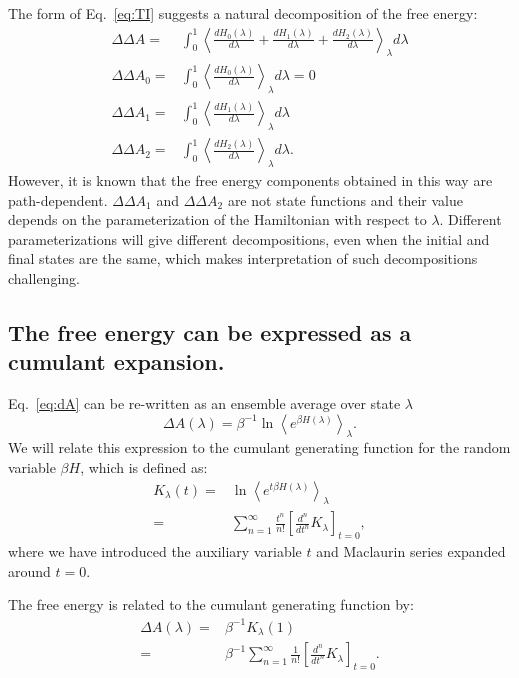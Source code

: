 \documentclass{article}
\begin{document}
The form of Eq.~\ref{eq:TI} suggests a natural decomposition of the free energy:
\begin{align}
\Delta\Delta A =&
	\int_0^1
    	\left\langle \frac{dH_0(\lambda)}{d\lambda} +
    	\frac{dH_1(\lambda)}{d\lambda} + 
		\frac{dH_2(\lambda)}{d\lambda}
        \right\rangle_\lambda d\lambda \nonumber\\
\Delta\Delta A_0 =&
	\int_0^1 \left\langle \frac{dH_0(\lambda)}{d\lambda}\right\rangle_\lambda d\lambda = 0 \nonumber\\          
\Delta\Delta A_1 =&
	\int_0^1 \left\langle \frac{dH_1(\lambda)}{d\lambda}\right\rangle_\lambda d\lambda \nonumber\\
\Delta\Delta A_2 =&
	\int_0^1 \left\langle \frac{dH_2(\lambda)}{d\lambda}\right\rangle_\lambda d\lambda.    
\label{eq:naive}
\end{align}
However, it is known that the free energy components obtained in this way are path-dependent. $\Delta\Delta A_1$ and $\Delta\Delta A_2$ are not state functions and their value depends on the parameterization of the Hamiltonian with respect to $\lambda$. Different parameterizations will give different decompositions, even when the initial and final states are the same, which makes interpretation of such decompositions challenging.



\subsection{The free energy can be expressed as a cumulant expansion.}

Eq.~\ref{eq:dA} can be re-written as an ensemble average over state $\lambda$
\begin{equation}
\Delta A(\lambda) =
	\beta^{-1} \ln \left\langle e^{\beta H(\lambda)} \right\rangle_\lambda.
\label{eq:avg_expr}
\end{equation}
We will relate this expression to the cumulant generating function for the random variable $\beta H$, which is defined as:
\begin{align}
K_{\lambda}(t) =&
	\ln \left\langle 
    	e^{t \beta H(\lambda)}
    \right\rangle_\lambda \\
    =& 
    \sum_{n=1}^{\infty}
            	\frac{t^n}{n!}
                \left[ \frac{d^n}{dt^n} K_{\lambda}\right]_{t=0},
\end{align}
where we have introduced the auxiliary variable $t$ and Maclaurin series expanded around $t=0$.

The free energy is related to the cumulant generating function by:
\begin{align}
\Delta A(\lambda) =& \beta^{-1} K_{\lambda}(1) \nonumber\\
                  =& \beta^{-1} \sum_{n=1}^{\infty}
            			\frac{1}{n!}\left[
                        	\frac{d^n}{dt^n} K_{\lambda}
                        \right]_{t=0}.
\end{align}
\end{document}

